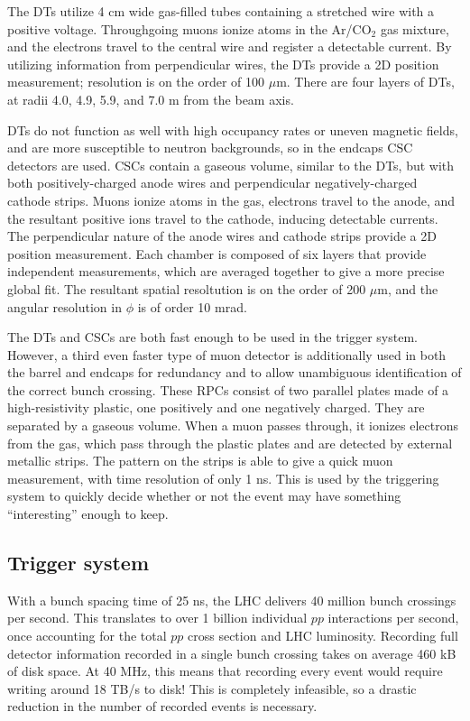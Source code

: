 The DTs utilize 4 cm wide gas-filled tubes containing a 
stretched wire with a positive voltage.
Throughgoing muons ionize atoms in the Ar/CO$_2$ gas mixture, and the electrons
travel to the central wire and register a detectable current.
By utilizing information from perpendicular wires, 
the DTs provide a 2D position measurement; resolution is on
the order of 100 $\mu$m.
There are four layers of DTs, at radii 4.0, 4.9, 5.9, and 7.0 m from
the beam axis.

DTs do not function as well with high occupancy rates or uneven magnetic fields,
and are more susceptible to neutron backgrounds, so in the endcaps
CSC detectors are used. CSCs contain a gaseous volume, similar to the DTs, but
with both positively-charged anode wires and perpendicular negatively-charged
cathode strips. Muons ionize atoms in the gas, electrons travel to the anode,
and the resultant positive ions travel to the cathode, inducing detectable currents.
The perpendicular nature of the anode wires and cathode strips provide a 2D
position measurement. Each chamber is composed of six layers that provide independent
measurements, which are averaged together to give a more precise global fit.
The resultant spatial resoltution is on the order of 200 $\mu$m, and
the angular resolution in $\phi$ is of order 10 mrad.

The DTs and CSCs are both fast enough to be used in the trigger system. However,
a third even faster type of muon detector is additionally used in both the barrel and endcaps
for redundancy and to allow unambiguous identification of the correct
bunch crossing. These RPCs consist of two parallel plates made
of a high-resistivity plastic, one positively 
and one negatively charged. They are separated by a gaseous volume. When a muon passes
through, it ionizes electrons from the gas, which pass through the plastic plates
and are detected by external metallic strips. The pattern on the strips
is able to give a quick muon measurement, with time resolution of only 1 ns.
This is used by the triggering system to quickly decide whether or not 
the event may have something ``interesting'' enough to keep.

\subsection{Trigger system}

With a bunch spacing time of 25 ns, the LHC delivers 40 million
bunch crossings per second. This translates to over 1 billion individual
$pp$ interactions per second, once accounting for the total $pp$ cross section
and LHC luminosity.
Recording full detector information recorded in a single bunch crossing
takes on average 460 kB of disk space. At 40 MHz, this means that recording
every event would require writing around 18 TB/s to disk! This is completely
infeasible, so a drastic reduction in the number of recorded events is
necessary.

